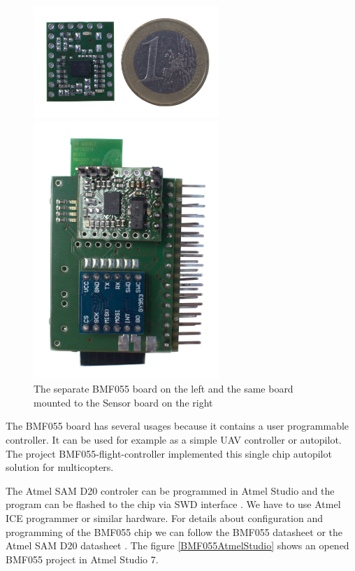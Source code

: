 \begin{figure}[H]
	\centering
	\label{BMF055photo}
	\caption{The separate BMF055 board on the left and the same board mounted to the Sensor board on the right}
	\begin{minipage}[c]{.45\textwidth}
		\includegraphics[width=7cm]{img/BMF055.jpg}
	\end{minipage}
	\quad\vrule{}
	\begin{minipage}[c]{.45\textwidth}
		\includegraphics[width=7cm]{img/HWassembledNoCoin.jpg}
	\end{minipage}
\end{figure}

The BMF055 board has several usages because it contains a user programmable controller. It can be used for example as a simple UAV controller or autopilot. The project BMF055-flight-controller \cite{BMF055flightController} implemented this single chip autopilot solution for multicopters.

The Atmel SAM D20 controler \cite{atmel:samd20} can be programmed in Atmel Studio \cite{AtmelStudio} and the program can be flashed to the chip via \ac{SWD} interface \cite{SWDinterface}. We have to use Atmel ICE programmer \cite{AtmelICE} or similar hardware. For details about configuration and programming of the BMF055 chip we can follow the BMF055 datasheet \cite{bosch:BMF055} or the Atmel SAM D20 datasheet \cite{atmel:samd20}. The figure \ref{BMF055AtmelStudio} shows an opened BMF055 project in Atmel Studio 7.

